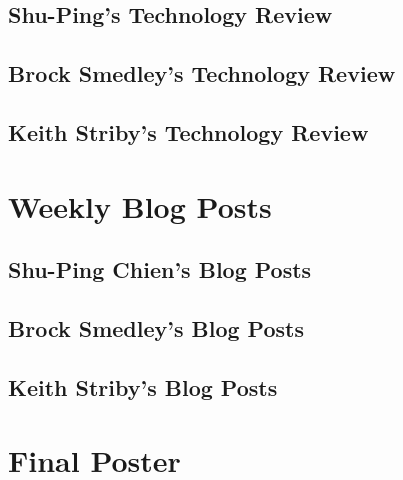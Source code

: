 \documentclass[letterpaper,10pt,serif,draftclsnofoot,onecolumn,compsoc,titlepage]{IEEEtran}
\begin{document}
	\subsection{Shu-Ping's Technology Review}

		

	\newpage

	\subsection{Brock Smedley's Technology Review}

		

	\newpage

	\subsection{Keith Striby's Technology Review}

		

	\newpage

\section{Weekly Blog Posts}
	\subsection{Shu-Ping Chien's Blog Posts}

		

	\newpage

	\subsection{Brock Smedley's Blog Posts}

		

	\newpage
	
	\subsection{Keith Striby's Blog Posts}

		

	\newpage

\section{Final Poster}
\end{document}
